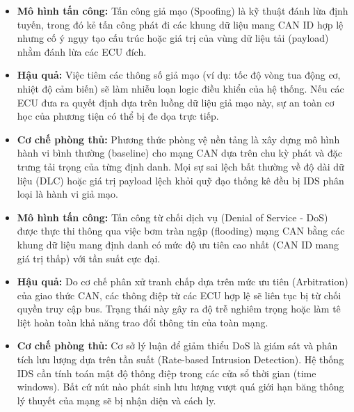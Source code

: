 \begin{itemize}[leftmargin=*]
    \item \textbf{Mô hình tấn công:} Tấn công giả mạo (Spoofing) là kỹ thuật đánh lừa định tuyến, trong đó kẻ tấn công phát đi các khung dữ liệu mang CAN ID hợp lệ nhưng cố ý ngụy tạo cấu trúc hoặc giá trị của vùng dữ liệu tải (payload) nhằm đánh lừa các ECU đích.
    \item \textbf{Hậu quả:} Việc tiêm các thông số giả mạo (ví dụ: tốc độ vòng tua động cơ, nhiệt độ cảm biến) sẽ làm nhiễu loạn logic điều khiển của hệ thống. Nếu các ECU đưa ra quyết định dựa trên luồng dữ liệu giả mạo này, sự an toàn cơ học của phương tiện có thể bị đe dọa trực tiếp.
    \item \textbf{Cơ chế phòng thủ:} Phương thức phòng vệ nền tảng là xây dựng mô hình hành vi bình thường (baseline) cho mạng CAN dựa trên chu kỳ phát và đặc trưng tải trọng của từng định danh. Mọi sự sai lệch bất thường về độ dài dữ liệu (DLC) hoặc giá trị payload lệch khỏi quỹ đạo thống kê đều bị IDS phân loại là hành vi giả mạo.
\end{itemize}


\begin{itemize}[leftmargin=*]
    \item \textbf{Mô hình tấn công:} Tấn công từ chối dịch vụ (Denial of Service - DoS) được thực thi thông qua việc bơm tràn ngập (flooding) mạng CAN bằng các khung dữ liệu mang định danh có mức độ ưu tiên cao nhất (CAN ID mang giá trị thấp) với tần suất cực đại.
    \item \textbf{Hậu quả:} Do cơ chế phân xử tranh chấp dựa trên mức ưu tiên (Arbitration) của giao thức CAN, các thông điệp từ các ECU hợp lệ sẽ liên tục bị từ chối quyền truy cập bus. Trạng thái này gây ra độ trễ nghiêm trọng hoặc làm tê liệt hoàn toàn khả năng trao đổi thông tin của toàn mạng.
    \item \textbf{Cơ chế phòng thủ:} Cơ sở lý luận để giảm thiểu DoS là giám sát và phân tích lưu lượng dựa trên tần suất (Rate-based Intrusion Detection). Hệ thống IDS cần tính toán mật độ thông điệp trong các cửa sổ thời gian (time windows). Bất cứ nút nào phát sinh lưu lượng vượt quá giới hạn băng thông lý thuyết của mạng sẽ bị nhận diện và cách ly.
\end{itemize}



